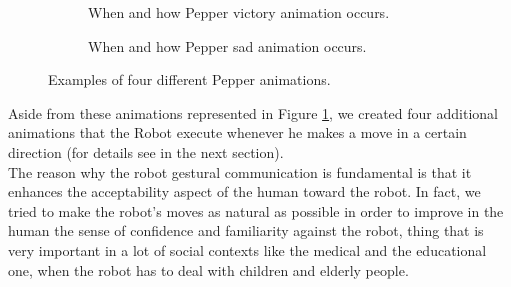 \documentclass{article}
\begin{document}
\begin{figure}[H]
\begin{subfigure}{.5\textwidth}
      \caption{When and how Pepper victory animation occurs.}
    \end{subfigure}%
    \begin{subfigure}{.5\textwidth}
      \centering
      \caption{When and how Pepper sad animation occurs.}
    \end{subfigure} 
    \caption{Examples of four different Pepper animations.}
    \label{fig:animations}
\end{figure}


Aside from these animations represented in Figure \ref{fig:animations}, we created four additional animations that the Robot execute whenever he makes a move in a certain direction (for details see in the next section).\\
\noindent The reason why the robot gestural communication is fundamental is that it enhances the acceptability aspect of the human toward the robot. In fact, we tried to make the robot's moves as natural as possible in order to improve in the human the sense of confidence and familiarity against the robot, thing that is very important in a lot of social contexts like the medical and the educational one, when the robot has to deal with children and elderly people.
\end{document}
